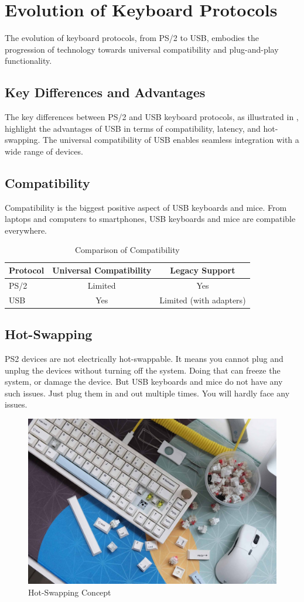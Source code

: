 \section{Evolution of Keyboard Protocols}
The evolution of keyboard protocols, from PS/2 to USB, embodies the progression of technology towards universal compatibility and plug-and-play functionality. 

\subsection{Key Differences and Advantages}
The key differences between PS/2 \cite{chapweske2003ps} and USB keyboard protocols, as illustrated in 
\cite{lee2011keyboard}, highlight the advantages of USB in terms of compatibility, latency, and hot-swapping. The universal compatibility of USB enables seamless integration with a wide range of devices.

\subsection{Compatibility}
Compatibility is the biggest positive aspect of USB keyboards and mice. From laptops and computers to smartphones, USB keyboards and mice are compatible everywhere.
\begin{table}[htbp]
    \centering
    \caption{Comparison of Compatibility}
    \begin{tabular}{|l|c|c|}
        \hline
        \textbf{Protocol} & \textbf{Universal Compatibility} & \textbf{Legacy Support} \\
        \hline
        PS/2 & Limited & Yes \\
        \hline
        USB & Yes & Limited (with adapters) \\
        \hline
    \end{tabular}
\end{table}

\subsection{Hot-Swapping}
PS2 devices are not electrically hot-swappable. It means you cannot plug and unplug the devices without turning off the system. Doing that can freeze the system, or damage the device. But USB keyboards and mice do not have any such issues. Just plug them in and out multiple times. You will hardly face any issues.
\begin{figure}[htbp]
    \centering
    \includegraphics[width=0.6\linewidth]{hot-swapping.jpg}
    \caption{Hot-Swapping Concept}
    \label{fig:hot-swapping}
\end{figure}

